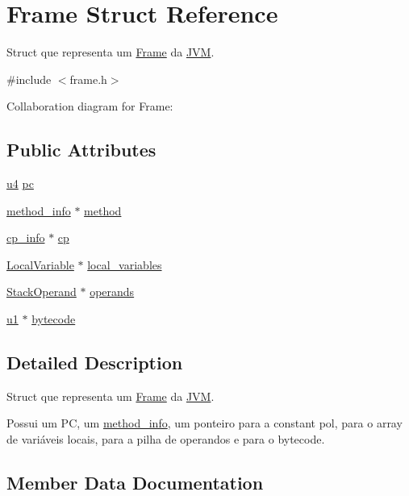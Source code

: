\hypertarget{structFrame}{}\section{Frame Struct Reference}
\label{structFrame}


Struct que representa um \hyperlink{structFrame}{Frame} da \hyperlink{structJVM}{J\+VM}.  




{\ttfamily \#include $<$frame.\+h$>$}



Collaboration diagram for Frame\+:
\subsection*{Public Attributes}
\begin{DoxyCompactItemize}
\item 
\hyperlink{structures_8h_ae391a1d79bb0c8cbc283f0283e3c098b}{u4} \hyperlink{structFrame_ada6a6cf76d00cbadf43a86a686dd026c}{pc}
\item 
\hyperlink{structmethod__info}{method\+\_\+info} $\ast$ \hyperlink{structFrame_af0943cac72b53aa5aa67f3e7097430a1}{method}
\item 
\hyperlink{structcp__info}{cp\+\_\+info} $\ast$ \hyperlink{structFrame_ada1bd832b6f72f87a35d88c68b9a188a}{cp}
\item 
\hyperlink{structLocalVariable}{Local\+Variable} $\ast$ \hyperlink{structFrame_a1a3968ae645e9c154229a2631639ebd5}{local\+\_\+variables}
\item 
\hyperlink{structStackOperand}{Stack\+Operand} $\ast$ \hyperlink{structFrame_ab311fc7762ab460f039e58b024c4d229}{operands}
\item 
\hyperlink{structures_8h_a64f8055b64cf2a4c299c841130c5c938}{u1} $\ast$ \hyperlink{structFrame_ad3bdd8cc30352e62af5898b699d54c16}{bytecode}
\end{DoxyCompactItemize}


\subsection{Detailed Description}
Struct que representa um \hyperlink{structFrame}{Frame} da \hyperlink{structJVM}{J\+VM}. 

Possui um PC, um \hyperlink{structmethod__info}{method\+\_\+info}, um ponteiro para a constant pol, para o array de variáveis locais, para a pilha de operandos e para o bytecode. 

\subsection{Member Data Documentation}
